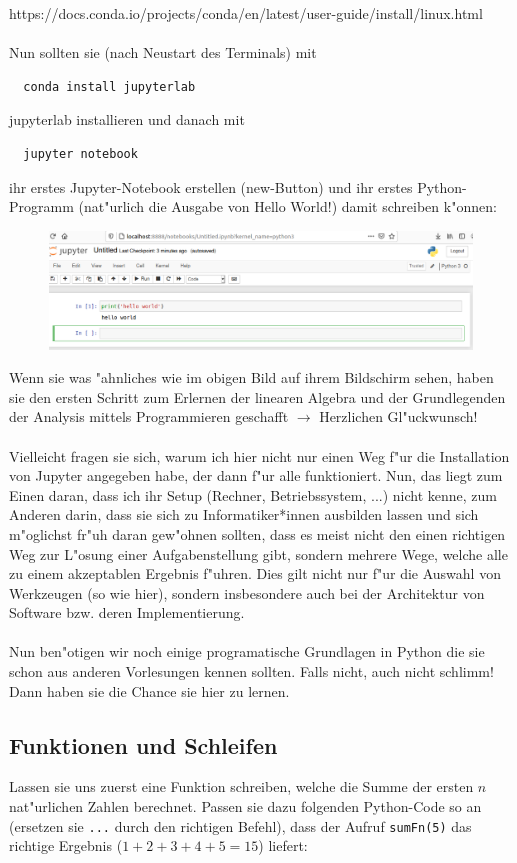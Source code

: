 \documentclass{article}
\begin{document}
https://docs.conda.io/projects/conda/en/latest/user-guide/install/linux.html\\\\
Nun sollten sie (nach Neustart des Terminals) mit 
\begin{verbatim}
  conda install jupyterlab
\end{verbatim}
jupyterlab installieren und danach mit 
\begin{verbatim}
  jupyter notebook
\end{verbatim}
ihr erstes Jupyter-Notebook erstellen (new-Button) und ihr erstes Python-Programm (nat"urlich die Ausgabe von Hello World!) damit schreiben k"onnen:
\begin{figure}[H]
\centering
\includegraphics[width=0.9\columnwidth]{jupyternotebookhelloworld.png}
\end{figure}\noindent
Wenn sie was "ahnliches wie im obigen Bild auf ihrem Bildschirm sehen, haben sie den ersten Schritt zum Erlernen der linearen Algebra und der Grundlegenden der Analysis mittels Programmieren geschafft $\rightarrow$ Herzlichen Gl"uckwunsch!
\\\\
Vielleicht fragen sie sich, warum ich hier nicht nur einen Weg f"ur die Installation von Jupyter angegeben habe, der dann f"ur alle funktioniert. 
Nun, das liegt zum Einen daran, dass ich ihr \glqq Setup\grqq{} (Rechner, Betriebssystem, ...) nicht kenne, zum Anderen darin, dass sie sich zu Informatiker*innen 
ausbilden lassen und sich m"oglichst fr"uh daran gew"ohnen sollten, dass es meist nicht \glqq den einen richtigen Weg\grqq{}
zur L"osung einer Aufgabenstellung gibt, sondern mehrere Wege, welche alle zu einem akzeptablen Ergebnis f"uhren. Dies gilt nicht nur f"ur die 
Auswahl von Werkzeugen (so wie hier), sondern insbesondere auch bei der Architektur von Software bzw. deren Implementierung.
\\\\
Nun ben"otigen wir noch einige programatische Grundlagen in Python die sie schon aus anderen Vorlesungen kennen sollten. Falls nicht, auch nicht schlimm! Dann haben sie die Chance sie hier zu lernen.

\subsection*{Funktionen und Schleifen}
Lassen sie uns zuerst eine Funktion schreiben, welche die Summe der ersten $n$ nat"urlichen Zahlen berechnet. Passen sie dazu folgenden Python-Code so an (ersetzen sie \verb+...+ durch den richtigen Befehl), dass der Aufruf \verb+sumFn(5)+ das richtige Ergebnis ($1+2+3+4+5 = 15$) liefert:
\end{document}
